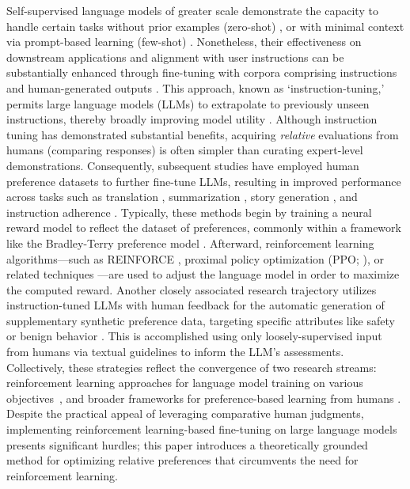 Self-supervised language models of greater scale demonstrate the capacity to handle certain tasks without prior examples (zero-shot) \citep{radford2019language}, or with minimal context via prompt-based learning (few-shot) \citep{gpt3,megatron,chowdhery2022palm}. Nonetheless, their effectiveness on downstream applications and alignment with user instructions can be substantially enhanced through fine-tuning with corpora comprising instructions and human-generated outputs \citep{mishra-etal-2022-cross,sanh2022multitask,chung2022scaling,thoppilan2022lamda}. This approach, known as `instruction-tuning,' permits large language models (LLMs) to extrapolate to previously unseen instructions, thereby broadly improving model utility \citep{chung2022scaling}. Although instruction tuning has demonstrated substantial benefits, acquiring \textit{relative} evaluations from humans (comparing responses) is often simpler than curating expert-level demonstrations. Consequently, subsequent studies have employed human preference datasets to further fine-tune LLMs, resulting in improved performance across tasks such as translation \citep{kreutzer-etal-2018-reliability}, summarization \citep{stiennon2022learning,ziegler2020finetuning}, story generation \citep{ziegler2020finetuning}, and instruction adherence \citep{ouyang2022training,ramamurthy2023is}. Typically, these methods begin by training a neural reward model to reflect the dataset of preferences, commonly within a framework like the Bradley-Terry preference model \citep{bradley1952rankanalysis}. Afterward, reinforcement learning algorithms—such as REINFORCE \citep{williams1992reinforce}, proximal policy optimization (PPO; \cite{schulman2017proximal}), or related techniques \citep{ramamurthy2023is}—are used to adjust the language model in order to maximize the computed reward. Another closely associated research trajectory utilizes instruction-tuned LLMs with human feedback for the automatic generation of supplementary synthetic preference data, targeting specific attributes like safety or benign behavior \citep{bai2022constitutional}. This is accomplished using only loosely-supervised input from humans via textual guidelines to inform the LLM's assessments. Collectively, these strategies reflect the convergence of two research streams: reinforcement learning approaches for language model training on various objectives~\citep{Ranzato2015SequenceLT,paulus2018a,wu2018learning}, and broader frameworks for preference-based learning from humans \citep{christiano2017deep,kupcsik2018learning}. Despite the practical appeal of leveraging comparative human judgments, implementing reinforcement learning-based fine-tuning on large language models presents significant hurdles; this paper introduces a theoretically grounded method for optimizing relative preferences that circumvents the need for reinforcement learning.


